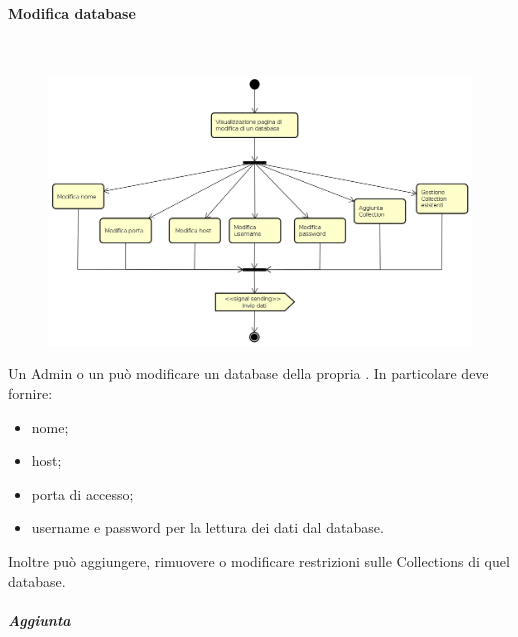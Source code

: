 \paragraph{Modifica database} \mbox{} \\
\begin{figure}[H]
\begin{center}
\includegraphics[width=15cm]{res/sections/backend/activities/modificaDatabase.png}
\end{center}
\end{figure}
Un Admin o un  può modificare un database della propria . In particolare deve fornire:
\begin{itemize}
\item nome;
\item host;
\item porta di accesso;
\item username e password per la lettura dei dati dal database.
\end{itemize}
Inoltre può aggiungere, rimuovere o modificare restrizioni sulle Collections di quel database.
\newpage
\subparagraph{Aggiunta } \mbox{} \\
